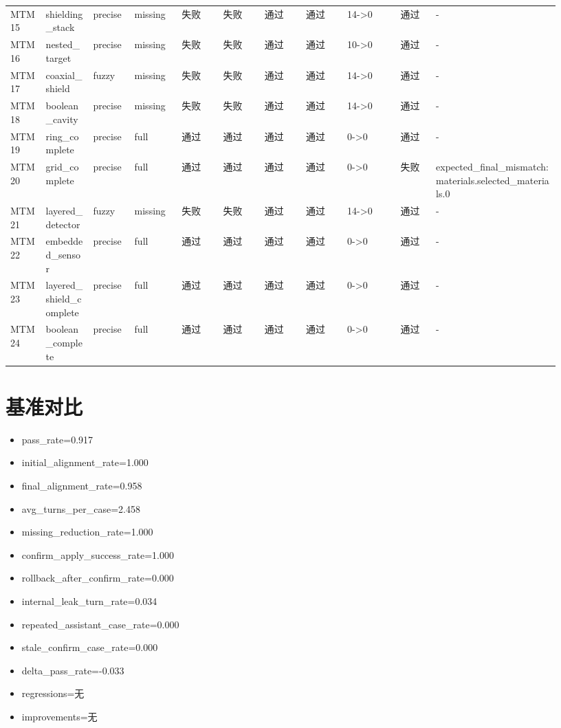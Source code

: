 \documentclass[11pt]{ctexart}
\begin{document}
\begin{longtable}{p{0.06\linewidth}p{0.08\linewidth}p{0.07\linewidth}p{0.08\linewidth}p{0.07\linewidth}p{0.07\linewidth}p{0.07\linewidth}p{0.07\linewidth}p{0.09\linewidth}p{0.06\linewidth}p{0.21\linewidth}}
MTM15 & shielding\_stack & precise & missing & 失败 & 失败 & 通过 & 通过 & 14->0 & 通过 & - \\
MTM16 & nested\_target & precise & missing & 失败 & 失败 & 通过 & 通过 & 10->0 & 通过 & - \\
MTM17 & coaxial\_shield & fuzzy & missing & 失败 & 失败 & 通过 & 通过 & 14->0 & 通过 & - \\
MTM18 & boolean\_cavity & precise & missing & 失败 & 失败 & 通过 & 通过 & 14->0 & 通过 & - \\
MTM19 & ring\_complete & precise & full & 通过 & 通过 & 通过 & 通过 & 0->0 & 通过 & - \\
MTM20 & grid\_complete & precise & full & 通过 & 通过 & 通过 & 通过 & 0->0 & 失败 & expected\_final\_mismatch:materials.selected\_materials.0 \\
MTM21 & layered\_detector & fuzzy & missing & 失败 & 失败 & 通过 & 通过 & 14->0 & 通过 & - \\
MTM22 & embedded\_sensor & precise & full & 通过 & 通过 & 通过 & 通过 & 0->0 & 通过 & - \\
MTM23 & layered\_shield\_complete & precise & full & 通过 & 通过 & 通过 & 通过 & 0->0 & 通过 & - \\
MTM24 & boolean\_complete & precise & full & 通过 & 通过 & 通过 & 通过 & 0->0 & 通过 & - \\
\bottomrule
\end{longtable}
\section{基准对比}
\begin{itemize}
\item pass\_rate=0.917
\item initial\_alignment\_rate=1.000
\item final\_alignment\_rate=0.958
\item avg\_turns\_per\_case=2.458
\item missing\_reduction\_rate=1.000
\item confirm\_apply\_success\_rate=1.000
\item rollback\_after\_confirm\_rate=0.000
\item internal\_leak\_turn\_rate=0.034
\item repeated\_assistant\_case\_rate=0.000
\item stale\_confirm\_case\_rate=0.000
\item delta\_pass\_rate=-0.033
\item regressions=无
\item improvements=无
\end{itemize}
\appendix
\end{document}
